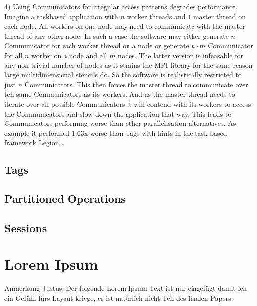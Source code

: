 \documentclass[sigconf]{acmart} %
\begin{document}
4) Using Communicators for irregular access patterns degrades performance.
Imagine a taskbased application with $n$ worker threads and $1$ master thread on each node.
All workers on one node may need to communicate with the master thread of any other node.
In such a case the software may either generate $n$ Communicator for each worker thread on a node or generate $n \cdot m$ Communicator for all $n$ worker on a node and all $m$ nodes.
The latter version is infeasable for any non trivial number of nodes as it strains the MPI library for the same reason large multidimensional stencils do.
So the software is realistically restricted to just $n$ Communicators.
This then forces the master thread to communicate over teh same Communicators as its workers.
And as the master thread needs to iterate over all possible Communicators it will contend with its workers to access the Communicators and slow down the application that way.
This leads to Communicators performing worse than other parallelisation alternatives.
As example it performed 1.63x worse than Tags with hints in the task-based framework Legion \cite{zambreLogicalParallel2021}.

\subsection{Tags}
\subsection{Partitioned Operations}
\subsection{Sessions} %

\section{Lorem Ipsum}

Anmerkung Justus: Der folgende Lorem Ipsum Text ist nur eingefügt damit ich ein Gefühl fürs Layout kriege, er ist natürlich nicht Teil des finalen Papers.
\end{document}

